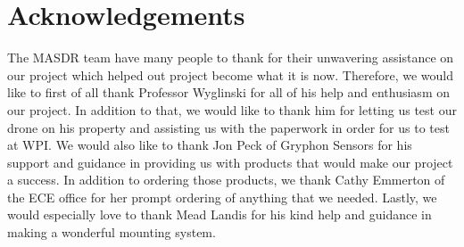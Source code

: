\chapter*{Acknowledgements}

The MASDR team have many people to thank for their unwavering assistance on our project which helped out project become what it is now.  Therefore, we would like to first of all thank Professor Wyglinski for all of his help and enthusiasm on our project.  In addition to that, we would like to thank him for letting us test our drone on his property and assisting us with the paperwork in order for us to test at WPI.  We would also like to thank Jon Peck of Gryphon Sensors for his support and guidance in providing us with products that would make our project a success.  In addition to ordering those products, we thank Cathy Emmerton of the ECE office for her prompt ordering of anything that we needed.  Lastly, we would especially love to thank Mead Landis for his kind help and guidance in making a wonderful mounting system.
